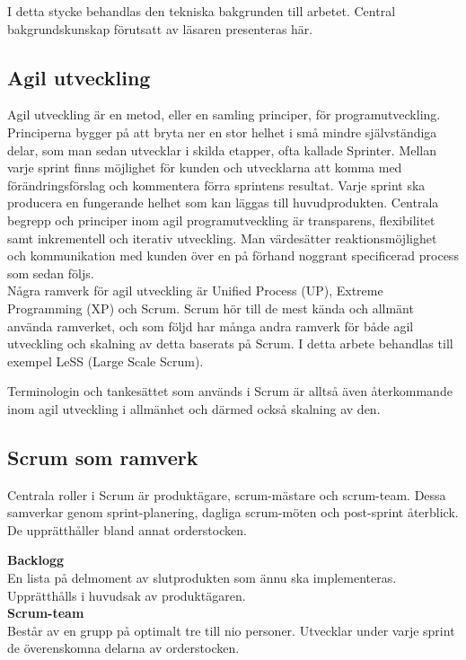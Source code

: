 	I detta stycke behandlas den tekniska bakgrunden till arbetet. Central bakgrundskunskap förutsatt av läsaren presenteras här.
	
	\subsection{Agil utveckling}
	
		Agil utveckling är en metod, eller en samling principer, för programutveckling. Principerna bygger på att bryta ner en stor helhet i små mindre självständiga delar, som man sedan utvecklar i skilda etapper, ofta kallade Sprinter.
		Mellan varje sprint finns möjlighet för kunden och utvecklarna att komma med förändringsförslag och kommentera förra sprintens resultat. Varje sprint ska producera en fungerande helhet som kan läggas till huvudprodukten. Centrala begrepp och principer inom agil programutveckling är transparens, flexibilitet samt inkrementell och iterativ utveckling. Man värdesätter reaktionsmöjlighet och kommunikation med kunden över en på förhand noggrant specificerad process som sedan följs. \cite{agile_manifesto}
		\\
		Några ramverk för agil utveckling är Unified Process (UP), Extreme Programming (XP) och Scrum.
		Scrum hör till de mest kända och allmänt använda ramverket, och som följd har många andra ramverk för både agil utveckling och skalning av detta baserats på Scrum. I detta arbete behandlas till exempel LeSS (Large Scale Scrum).
		
		Terminologin och tankesättet som används i Scrum är alltså även återkommande inom agil utveckling i allmänhet och därmed också skalning av den.
		
	\subsection{Scrum som ramverk}	
		Centrala roller i Scrum är produktägare, scrum-mästare och scrum-team. Dessa samverkar genom sprint-planering, dagliga scrum-möten och post-sprint återblick. De upprätthåller bland annat orderstocken.
		
		\textbf{Backlogg} \\
		En lista på delmoment av slutprodukten som ännu ska implementeras. Upprätthålls i huvudsak av produktägaren. \\	
		
		\textbf{Scrum-team} \\
		Består av en grupp på optimalt tre till nio personer. Utvecklar under varje sprint de överenskomna delarna av orderstocken. \\
		
